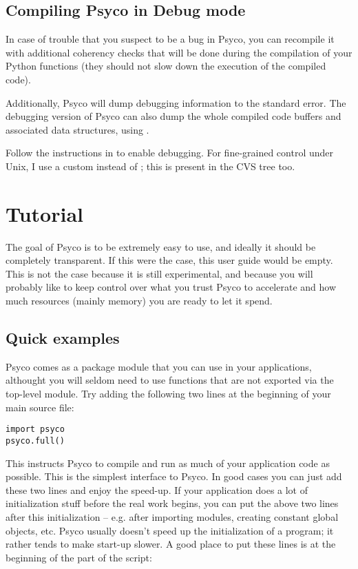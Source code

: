 \documentclass{manual}
\begin{document}
\section{Compiling Psyco in Debug mode}\label{debugpsyco}

In case of trouble that you suspect to be a bug in Psyco, you can recompile it with additional coherency checks that will be done during the compilation of your Python functions (they should not slow down the execution of the compiled code).

Additionally, Psyco will dump debugging information to the standard error.  The debugging version of Psyco can also dump the whole compiled code buffers and associated data structures, using .

Follow the instructions in  to enable debugging.  For fine-grained control under Unix, I use a custom  instead of ; this  is present in the CVS tree too.



\chapter{Tutorial}

The goal of Psyco is to be extremely easy to use, and ideally it should be completely transparent.  If this were the case, this user guide would be empty.  This is not the case because it is still experimental, and because you will probably like to keep control over what you trust Psyco to accelerate and how much resources (mainly memory) you are ready to let it spend.


\section{Quick examples}

Psyco comes as a package module that you can use in your applications, althought you will seldom need to use functions that are not exported via the top-level  module.  Try adding the following two lines at the beginning of your main  source file:

\begin{verbatim}
import psyco
psyco.full()
\end{verbatim}

This instructs Psyco to compile and run as much of your application code as possible.  This is the simplest interface to Psyco.  In good cases you can just add these two lines and enjoy the speed-up.  If your application does a lot of initialization stuff before the real work begins, you can put the above two lines after this initialization -- e.g. after importing modules, creating constant global objects, etc.  Psyco usually doesn't speed up the initialization of a program; it rather tends to make start-up slower.  A good place to put these lines is at the beginning of the  part of the script:
\end{document}
